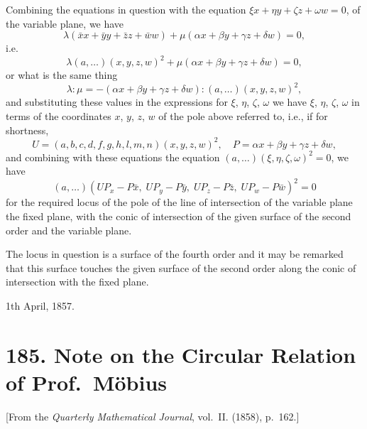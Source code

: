 \documentclass[11pt,a4paper]{book}
\begin{document}
Combining the equations in question with the equation $\xi x + \eta y + \zeta z + \omega w = 0$, of the variable plane, we have
\[
\lambda(\bar{x}x + \bar{y}y + \bar{z}z + \bar{w}w) + \mu(\alpha x + \beta y + \gamma z + \delta w) = 0,
\]
i.e.
\[
\lambda(a, \ldots)(x, y, z, w)^2 + \mu(\alpha x + \beta y + \gamma z + \delta w) = 0,
\]
or what is the same thing
\[
\lambda : \mu = -(\alpha x + \beta y + \gamma z + \delta w) : (a, \ldots)(x, y, z, w)^2,
\]
and substituting these values in the expressions for $\xi$, $\eta$, $\zeta$, $\omega$ we have $\xi$, $\eta$, $\zeta$, $\omega$ in terms of the coordinates $x$, $y$, $z$, $w$ of the pole above referred to, i.e., if for shortness,
\[
U = (a, b, c, d, f, g, h, l, m, n)(x, y, z, w)^2, \quad P = \alpha x + \beta y + \gamma z + \delta w,
\]
and combining with these equations the equation $(a, \ldots)(\xi, \eta, \zeta, \omega)^2 = 0$, we have
\[
(a, \ldots)(UP_x - P\bar{x}, \; UP_y - P\bar{y}, \; UP_z - P\bar{z}, \; UP_w - P\bar{w})^2 = 0
\]
for the required locus of the pole of the line of intersection of the variable plane the fixed plane, with the conic of intersection of the given surface of the second order and the variable plane.

The locus in question is a surface of the fourth order and it may be remarked that this surface touches the given surface of the second order along the conic of intersection with the fixed plane.

\begin{flushright}
1th April, 1857.
\end{flushright}


\newpage
\section*{185. Note on the Circular Relation of Prof.\ M\"{o}bius}

[From the \textit{Quarterly Mathematical Journal}, vol.~II. (1858), p.~162.]
\end{document}

